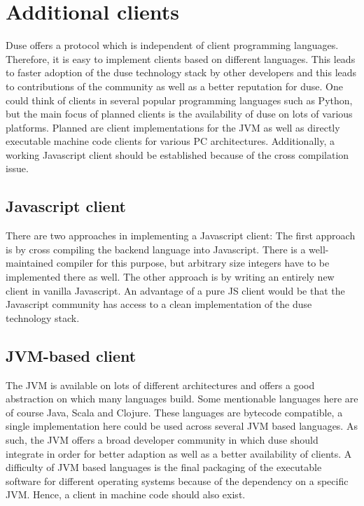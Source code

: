 \section{Additional clients}

Duse offers a protocol which is independent of client programming languages.
Therefore, it is easy to implement clients based on different
languages. This leads to faster adoption of the duse technology stack by
other developers and this leads to contributions of the community as well
as a better reputation for duse. One could think of clients in several
popular programming languages such as Python, but the main focus of planned
clients is the availability of duse on lots of various platforms.
Planned are client implementations for the JVM as well as directly executable
machine code clients for various PC architectures. Additionally, a working
Javascript client should be established because of the cross compilation issue.

\subsection{Javascript client}

There are two approaches in implementing a Javascript client: The first
approach is by cross compiling the backend language into Javascript. There
is a well-maintained compiler for this purpose, but arbitrary size integers
have to be implemented there as well. The other approach is by writing
an entirely new client in vanilla Javascript. An advantage of a pure JS
client would be that the Javascript community has access to a clean
implementation of the duse technology stack.

\subsection{JVM-based client}

The JVM is available on lots of different architectures and offers a good 
abstraction on which many languages build. Some mentionable languages here are
of course Java, Scala and Clojure. These languages are bytecode compatible,
a single implementation here could be used across several JVM based languages.
As such, the JVM offers a broad developer community in which duse should
integrate in order for better adaption as well as a better availability of
clients. A difficulty of JVM based languages is the final packaging of the
executable software for different operating systems because of the dependency
on a specific JVM. Hence, a client in machine code should also exist.

